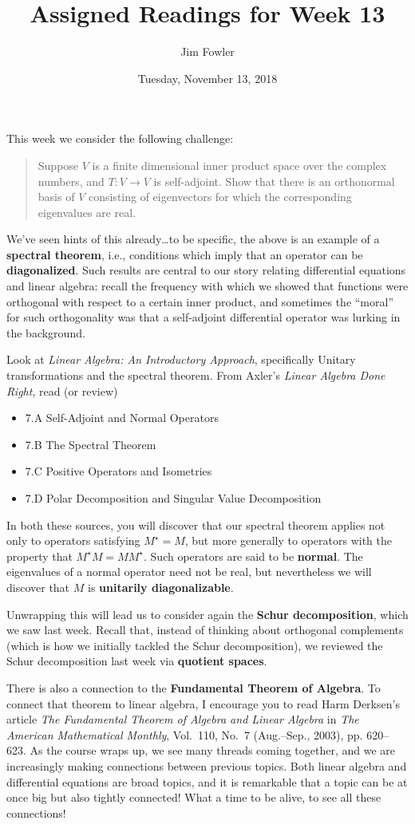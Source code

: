 \documentclass{homework}
\author{Jim Fowler}
\title{Assigned Readings for Week 13}
\date{Tuesday, November 13, 2018}
\begin{document}
\maketitle

This week we consider the following challenge:
\begin{quote}
  Suppose $V$ is a finite dimensional inner product space over the
  complex numbers, and $T : V \to V$ is self-adjoint.  Show that there
  is an orthonormal basis of $V$ consisting of eigenvectors for which
  the corresponding eigenvalues are real.
\end{quote}
We've seen hints of this already\ldots to be specific, the above is an
example of a \textbf{spectral theorem}, i.e., conditions which imply
that an operator can be \textbf{diagonalized}.  Such results are
central to our story relating differential equations and linear
algebra: recall the frequency with which we showed that functions were
orthogonal with respect to a certain inner product, and sometimes the
``moral'' for such orthogonality was that a self-adjoint differential
operator was lurking in the background.

Look at \textit{Linear Algebra: An
  Introductory Approach}, specifically  Unitary transformations and the spectral theorem.
From Axler's \textit{Linear Algebra Done Right}, read (or review)
\begin{itemize}
\item \textsection 7.A Self-Adjoint and Normal Operators
\item \textsection 7.B The Spectral Theorem
\item \textsection 7.C Positive Operators and Isometries
\item \textsection 7.D Polar Decomposition and Singular Value Decomposition
\end{itemize}

In both these sources, you will discover that our spectral theorem
applies not only to operators satisfying $M^\star = M$, but more
generally to operators with the property that $M^\star M = M M^\star$.
Such operators are said to be \textbf{normal}.  The eigenvalues of a
normal operator need not be real, but nevertheless we will discover
that $M$ is \textbf{unitarily diagonalizable}.

Unwrapping this will lead us to consider again the \textbf{Schur
  decomposition}, which we saw last week.  Recall that, instead of
thinking about orthogonal complements (which is how we initially
tackled the Schur decomposition), we reviewed the Schur decomposition
last week via \textbf{quotient spaces}.

There is also a connection to the \textbf{Fundamental Theorem of
  Algebra}.  To connect that theorem to linear algebra, I encourage
you to read Harm Derksen's article \textit{The Fundamental Theorem of
  Algebra and Linear Algebra} in \textit{The American Mathematical
  Monthly}, Vol.~110, No.~7 (Aug.--Sep., 2003), pp. 620--623.
As the course wraps up, we see many threads coming together, and we
are increasingly making connections between previous topics.  Both
linear algebra and differential equations are broad topics, and it is
remarkable that a topic can be at once big but also tightly connected!
What a time to be alive, to see all these connections!
\end{document}
